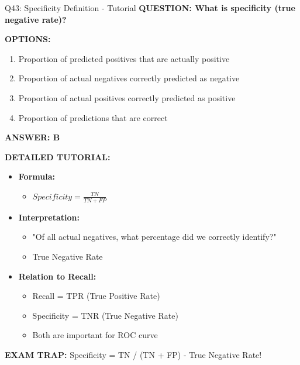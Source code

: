 \documentclass[8pt]{beamer}
\begin{document}
	\begin{frame}{Q43: Specificity Definition - Tutorial}
		\fontsize{6.5}{7.5}\selectfont
		\textbf{QUESTION: What is specificity (true negative rate)?}
		
		\vspace{0.1cm}
		\textbf{OPTIONS:}
		\begin{enumerate}
			\item Proportion of predicted positives that are actually positive
			\item Proportion of actual negatives correctly predicted as negative
			\item Proportion of actual positives correctly predicted as positive
			\item Proportion of predictions that are correct
		\end{enumerate}
		
		\vspace{0.1cm}
		\textcolor{myblue}{\textbf{ANSWER: B}}
		
		\vspace{0.1cm}
		\textbf{DETAILED TUTORIAL:}
		\begin{itemize}
			\item \textbf{Formula:}
			\begin{itemize}
				\item $Specificity = \frac{TN}{TN + FP}$
			\end{itemize}
			\item \textbf{Interpretation:}
			\begin{itemize}
				\item "Of all actual negatives, what percentage did we correctly identify?"
				\item True Negative Rate
			\end{itemize}
			\item \textbf{Relation to Recall:}
			\begin{itemize}
				\item Recall = TPR (True Positive Rate)
				\item Specificity = TNR (True Negative Rate)
				\item Both are important for ROC curve
			\end{itemize}
		\end{itemize}
		
		\textcolor{myred}{\textbf{EXAM TRAP:}} Specificity = \textcolor{myblue}{TN / (TN + FP)} - True Negative Rate!
	\end{frame}
	
\end{document}
